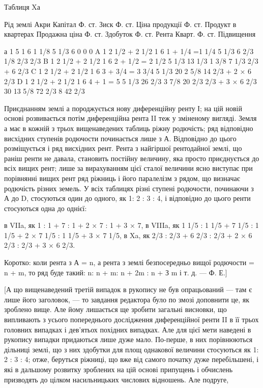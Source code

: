 Таблиця Xа

Рід землі
Акри
Капітал Ф. ст.
Зиск Ф. ст.
Ціна продукції Ф. ст.
Продукт в квартерах
Продажна ціна Ф. ст.
Здобуток Ф. ст.
Рента Кварт. Ф. ст.
Підвищення

а  1                5            1  6                  1 1/8   5 1/3   6            0          0    
      0
A  1  2 1/2 + 2 1/2     1  6  1 +  1/4 =1 1/4   5 1/3   6 2/3     1/8       2/3       2/3
B  1  2 1/2 + 2 1/2     1  6  2 + 1/2 = 2 1/2   5 1/3   13 1/3   1 3/8    7 1/3    2/3 + 6 2/3
C  1  2 1/2 + 2 1/2     1  6  3 + 3/4 = 3 3/4   5 1/3   20          2 5/8   14         2/3 + 2 × 6
2/3
D  1  2 1/2 + 2 1/2     1  6  4 + 1 = 5             5 1/3   26 2/3   3 7/8   20 2/3   2/3 + 3 × 6
2/3
                                        30             13 5/8                72 2/3   8          42
2/3

Приєднанням землі а породжується нову диференційну ренту І; на цій
новій основі розвивається потім диференційна рента II теж у зміненому вигляді.
Земля а має в кожній з трьох вищенаведених таблиць ріжну родючість; ряд
відповідно висхідних ступенів родючости починається лише з А. Відповідно до
цього розміщується і ряд висхідних рент. Рента з найгіршої рентодайної землі,
що раніш ренти не давала, становить постійну величину, яка просто приєднується
до всіх вищих рент; лише за вирахуванням цієї сталої величини ясно виступає
при порівнянні вищих рент ряд ріжниць і його паралелізм з рядом, що
визначає родючість різних земель. У всіх таблицях різні ступені родючости, починаючи
з А до D, стосуються один до одного, як 1: 2 : 3 : 4, і відповідно до
цього ренти стосуються одна до однієї:

в VIIa, як 1 : 1 + 7 : 1 + 2 × 7 : 1 + 3 × 7,
в VIIIa, як 1 1/5 : 1 1/5 + 7 1/5 : 1  1/5 + 2 × 7 1/5 : 1 1/5 + 3 × 7 1/5,
в Xa, як   2/3 : 2/3 + 6 2/3 : 2/3 + 2 × 6 2/3 : 2/3 + 3 × 6 2/3.

Коротко: коли рента з А = n, а рента з землі безпосередньо вищої родючости
= n + m, то ряд буде такий: n: n + m: n + 2m : n + З m і т. д. — Ф. Е.]

[А що вищенаведений третій випадок в рукопису не був опрацьований —
там є лише його заголовок, — то завдання редактора було по змозі доповнити
це, як зроблено вище. Але йому лишається ще зробити загальні висновки, що
випливають з усього попереднього дослідження диференційної ренти II в її трьох
головних випадках і дев’ятьох похідних випадках. Але для цієї мети наведені
в рукопису випадки придаються лише дуже мало. По-перше, в них порівнюються
дільниці землі, що з них здобутки для площ однакової величини стосуються
як 1: 2 : 3 : 4; отже, беруться ріжниці, що вже від самого початку дуже перебільшені,
і які в дальшому розвитку зроблених на цій основі припущень і обчислень
призводять до цілком насильницьких числових відношень. Але подруге,
\parbreak{}  %
